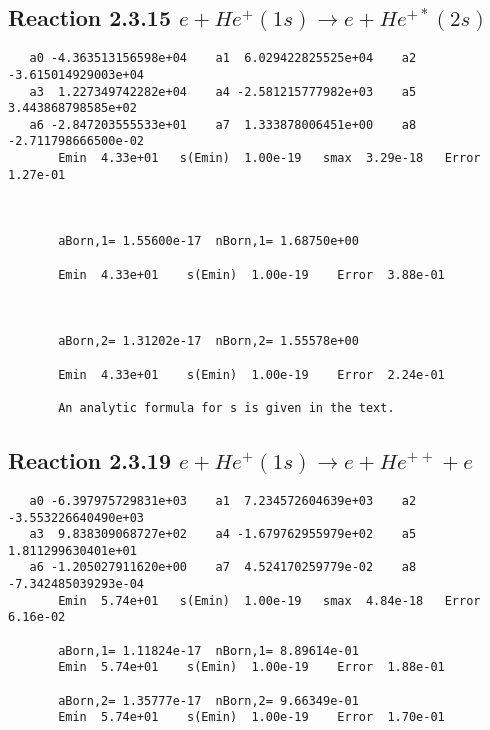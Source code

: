 \documentclass[12pt]{article}
\begin{document}
\newpage
\subsection{
Reaction 2.3.15 $   e + He^+(1s) \rightarrow e + He^{+*}(2s)$}





\begin{small}\begin{verbatim}
   a0 -4.363513156598e+04    a1  6.029422825525e+04    a2 -3.615014929003e+04
   a3  1.227349742282e+04    a4 -2.581215777982e+03    a5  3.443868798585e+02
   a6 -2.847203555533e+01    a7  1.333878006451e+00    a8 -2.711798666500e-02
       Emin  4.33e+01   s(Emin)  1.00e-19   smax  3.29e-18   Error  1.27e-01



       aBorn,1= 1.55600e-17  nBorn,1= 1.68750e+00

       Emin  4.33e+01    s(Emin)  1.00e-19    Error  3.88e-01



       aBorn,2= 1.31202e-17  nBorn,2= 1.55578e+00

       Emin  4.33e+01    s(Emin)  1.00e-19    Error  2.24e-01

       An analytic formula for s is given in the text.
\end{verbatim}\end{small}






                            


\newpage
\subsection{
Reaction 2.3.19 $   e + He^+(1s) \rightarrow e + He^{++} + e$}


\begin{small}\begin{verbatim}
   a0 -6.397975729831e+03    a1  7.234572604639e+03    a2 -3.553226640490e+03
   a3  9.838309068727e+02    a4 -1.679762955979e+02    a5  1.811299630401e+01
   a6 -1.205027911620e+00    a7  4.524170259779e-02    a8 -7.342485039293e-04
       Emin  5.74e+01   s(Emin)  1.00e-19   smax  4.84e-18   Error  6.16e-02

       aBorn,1= 1.11824e-17  nBorn,1= 8.89614e-01
       Emin  5.74e+01    s(Emin)  1.00e-19    Error  1.88e-01

       aBorn,2= 1.35777e-17  nBorn,2= 9.66349e-01
       Emin  5.74e+01    s(Emin)  1.00e-19    Error  1.70e-01
\end{verbatim}\end{small}
\end{document}
